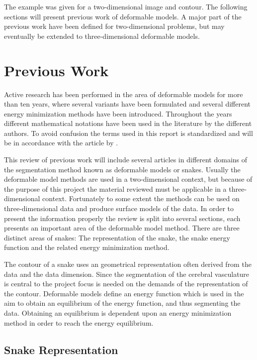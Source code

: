 The example was given for a two-dimensional image and contour. The
following sections will present previous work of deformable models. 
A major part of the previous work have been defined for
two-dimensional problems, but may eventually be extended to
three-dimensional deformable models. 

\section{Previous Work}
\label{sec:previous-work}

Active research has been performed in the area of deformable models for
more than ten years, where several variants have been formulated and
several different energy minimization methods have been
introduced. Throughout the years different mathematical notations have
been used in the literature by the different authors. To avoid
confusion the terms used in this report is standardized and will be
in accordance with the article by \citet{kass88}.

This review of previous work will include several articles in
different domains of the segmentation method known as deformable models
or snakes. Usually the deformable model methods are used in a
two-dimensional context, but because of the purpose of this project
the material reviewed must be applicable in a three-dimensional
context. Fortunately to some extent the methods can be used on
three-dimensional data and produce surface models of the data. In
order to present the information properly the review is split into
several sections, each presents an important area of the deformable
model method. There are three distinct areas of snakes:
The representation of the snake, the snake energy function and the
related energy minimization method.

The contour of a snake uses an geometrical representation often
derived from the data and the data dimension. Since the segmentation
of the cerebral vasculature is central to the project focus is needed
on the demands of the representation of the contour. Deformable models
define an energy function which is used in the aim to obtain an
equilibrium of the energy function, and thus segmenting the data.
Obtaining an equilibrium is dependent upon an energy minimization
method in order to reach the energy equilibrium.

\subsection{Snake Representation}
\label{sec:snake-representation}

